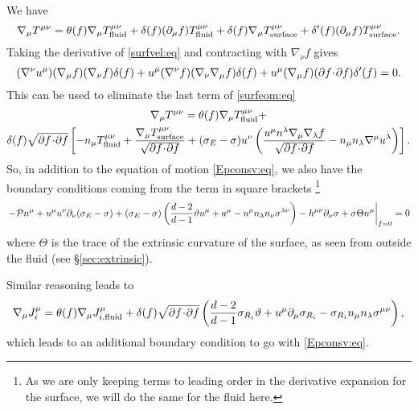 \documentclass[12pt]{article}
\newcommand{\ploc}{\mathcal{P}}
\begin{document}
We have
%
\begin{equation}\label{surfeom:eq}
  \nabla_\mu T^{\mu\nu} = \theta(f)\nabla_\mu T^{\mu\nu}_\text{fluid} + \delta(f)(\partial_\mu f) T^{\mu\nu}_\text{fluid} + \delta(f)\nabla_\mu T^{\mu\nu}_\text{surface} + \delta'(f)(\partial_\mu f) T^{\mu\nu}_\text{surface}.
\end{equation}
%
Taking the derivative of \eqref{surfvel:eq} and contracting with $\nabla_\nu f$ gives
%
\begin{equation*}
  (\nabla^\nu u^\mu) (\nabla_\mu f) (\nabla_\nu f) \delta(f)
  + u^\mu (\nabla^\nu f) (\nabla_\nu \nabla_\mu f) \delta(f)
  + u^\mu (\nabla_\mu f) (\partial f \!\cdot\! \partial f) \delta'(f)
  = 0.
\end{equation*}
%
This can be used to eliminate the last term of \eqref{surfeom:eq}
%
\begin{multline}\label{surfeom2:eq}
  \nabla_\mu T^{\mu\nu} = \theta(f)\nabla_\mu T^{\mu\nu}_\text{fluid} +\\ \delta(f)\sqrt{\partial f \!\cdot\! \partial f}\left [ 
  -n_\mu T^{\mu\nu}_\text{fluid} + \frac{\nabla_\mu T^{\mu\nu}_\text{surface}}{\sqrt{\partial f \!\cdot\! \partial f}}
  +(\sigma_E-\sigma)u^\nu\left ( \frac{u^\mu n^\lambda \nabla_\mu\nabla_\lambda f}{\sqrt{\partial f \!\cdot\! \partial f}} - n_\mu n_\lambda \nabla^\mu u^\lambda \right )
   \right ].
\end{multline}
%
So, in addition to the equation of motion \eqref{Epconsv:eq}, we also have the boundary conditions coming from the term in square brackets
\footnote{As we are only keeping terms to leading order in the derivative expansion for the surface, we will do the same for the fluid here.}
%
\begin{equation}\label{surfbc:eq}
  \left.
  -\ploc n^\mu + u^\mu u^\nu \p_\nu (\sigma_E-\sigma)
  +(\sigma_E-\sigma)\prn{ \frac{d-2}{d-1}\vartheta u^\mu  + a^\mu - u^\mu n_\lambda n_\nu \sigma^{\lambda\nu}}
  -h^{\mu\nu}\p_\nu\sigma + \sigma\Theta n^\mu
  \right\vert_{f=0} = 0
\end{equation}
%
where $\Theta$ is the trace of the extrinsic curvature of the surface, as seen from outside the fluid (see \S\ref{sec:extrinsic}).

Similar reasoning leads to
%
\begin{equation}\label{surfchbc:eq}
  \nabla_\mu J^\mu_i= \theta(f)\nabla_\mu J^\mu_{i,\text{fluid}}
   + \delta(f)\sqrt{\partial f \!\cdot\! \partial f} \left ( \frac{d-2}{d-1}\sigma_{R_i}\vartheta + u^\mu\partial_\mu\sigma_{R_i} - \sigma_{R_i}n_\mu n_\lambda \sigma^{\mu\nu} \right ),
\end{equation}
%
which leads to an additional boundary condition to go with \eqref{Epconsv:eq}.
\end{document}
